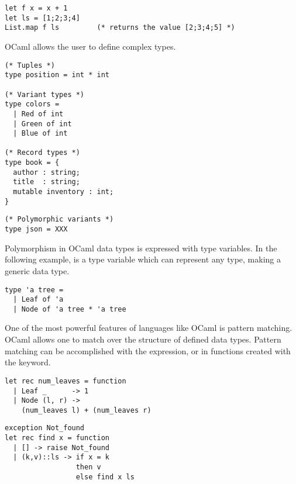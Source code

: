 \begin{lstlisting}
let f x = x + 1
let ls = [1;2;3;4]
List.map f ls         (* returns the value [2;3;4;5] *)
\end{lstlisting}

OCaml allows the user to define complex types.

\begin{lstlisting}
(* Tuples *)
type position = int * int

(* Variant types *)
type colors =
  | Red of int
  | Green of int
  | Blue of int

(* Record types *)
type book = {
  author : string;
  title  : string;
  mutable inventory : int;
}
\end{lstlisting}


\begin{lstlisting}
(* Polymorphic variants *)
type json = XXX
\end{lstlisting}


Polymorphism in OCaml data types is expressed with type variables. In
the following example,  is a type variable which can
represent any type, making  a generic data type.

\begin{lstlisting}
type 'a tree =
  | Leaf of 'a
  | Node of 'a tree * 'a tree
\end{lstlisting}


One of the most powerful features of languages like OCaml is pattern
matching. OCaml allows one to match over the structure of defined data
types. Pattern matching can be accomplished with the
expression, or in functions created with the  keyword.

\begin{lstlisting}
let rec num_leaves = function
  | Leaf _      -> 1
  | Node (l, r) ->
    (num_leaves l) + (num_leaves r)
\end{lstlisting}


\begin{lstlisting}
exception Not_found
let rec find x = function
  | [] -> raise Not_found
  | (k,v)::ls -> if x = k
                 then v
                 else find x ls
\end{lstlisting}

